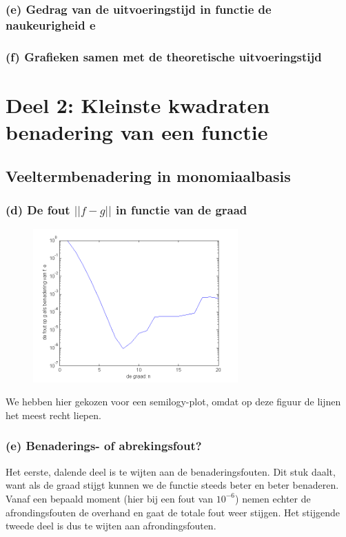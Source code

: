 \documentclass[11pt,a4paper]{article}
\begin{document}
\subsubsection*{(e) Gedrag van de uitvoeringstijd in functie de naukeurigheid e}
\subsubsection*{(f) Grafieken samen met de theoretische uitvoeringstijd}
\section{Deel 2: Kleinste kwadraten benadering van een functie}
\subsection{Veeltermbenadering in monomiaalbasis}
\subsubsection*{(d) De fout $||f-g||$ in functie van de graad}

\begin{figure}[H]
	\centering
	\includegraphics[width=0.7\textwidth]{22d1.png}
	\caption*{}
	\end{figure}
	
We hebben hier gekozen voor een semilogy-plot, omdat op deze figuur de lijnen het meest recht liepen.

\subsubsection*{(e) Benaderings- of abrekingsfout?}

Het eerste, dalende deel is te wijten aan de benaderingsfouten. Dit stuk daalt, want als de graad stijgt kunnen we de functie steeds beter en beter benaderen. Vanaf een bepaald moment (hier bij een fout van $10^{-6}$) nemen echter de afrondingsfouten de overhand en gaat de totale fout weer stijgen. Het stijgende tweede deel is dus te wijten aan afrondingsfouten.
\end{document}

